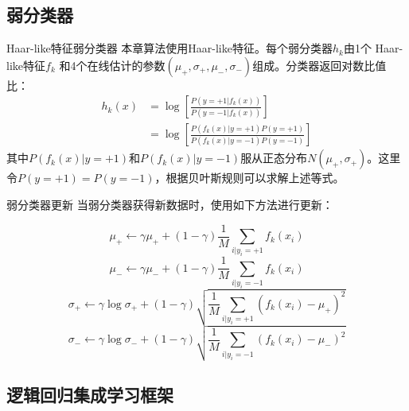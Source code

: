 \subsection{弱分类器}

\begin{frame}{Haar-like特征弱分类器}
本章算法使用Haar-like特征。每个弱分类器$ h_{k} $由1个 Haar-like特征$ f_{k} $ 和4个在线估计的参数$ (\mu_{+},\sigma_{+},\mu_{-},\sigma_{-}) $组成。分类器返回对数比值比：
\begin{equation}
\begin{aligned}
    h_{k}(x) &=\log[\frac{P(y=+1|f_{k}(x))}{P(y=-1|f_{k}(x))}]\\
          &=\log[\frac{P(f_{k}(x)|y=+1)P(y=+1)}{P(f_{k}(x)|y=-1)P(y=-1)}]
\end{aligned}
\end{equation}
其中$ P(f_{k}(x)|y=+1) $和$ P(f_{k}(x)|y=-1) $服从正态分布$ N(\mu_{+},\sigma_{+}) $。这里令$ P(y=+1)=P(y=-1) $，根据贝叶斯规则可以求解上述等式。
\end{frame}
\begin{frame}{弱分类器更新}
当弱分类器获得新数据时，使用如下方法进行更新：

\begin{equation}
\mu_{+}\longleftarrow \gamma\mu_{+}+(1-\gamma)\frac{1}{M}\sum_{i|y_{i}=+1}f_{k}(x_{i})
\label{eq:updatMuPosi}
\end{equation}
\begin{equation}
\mu_{-}\longleftarrow \gamma\mu_{-}+(1-\gamma)\frac{1}{M}\sum_{i|y_{i}=-1}f_{k}(x_{i})
\label{eq:updatMuNeg}
\end{equation}
\begin{equation}
\sigma_{+}\longleftarrow \gamma\log\sigma_{+}+(1-\gamma)\sqrt{\frac{1}{M}\sum_{i|y_{i}=+1}(f_{k}(x_{i})-\mu_{+})^{2}}
\label{eq:updatSigmaPosi}
\end{equation}
\begin{equation}
\sigma_{-}\longleftarrow \gamma\log\sigma_{-}+(1-\gamma)\sqrt{\frac{1}{M}\sum_{i|y_{i}=-1}(f_{k}(x_{i})-\mu_{-})^{2}}
\label{eq:updatSigmaNeg}
\end{equation}

\end{frame}

\subsection{逻辑回归集成学习框架}


